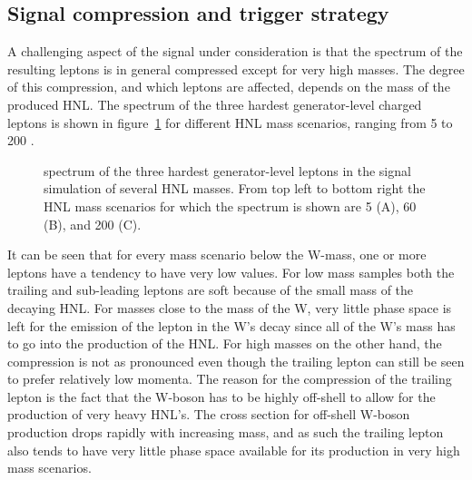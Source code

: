 \subsection{Signal compression and trigger strategy}\label{sec:compression}
A challenging aspect of the signal under consideration is that the \pt spectrum of the resulting leptons is in general compressed except for very high masses. The degree of this compression, and which leptons are affected, depends on the mass of the produced HNL. The \pt spectrum of the three hardest generator-level charged leptons is shown in figure~\ref{fig:genPt} for different HNL mass scenarios, ranging from 5 to 200 \GeV . 

\begin{figure}[h]
\caption{\pt spectrum of the three hardest generator-level leptons in
  the signal simulation of several HNL masses. From top left to bottom
  right the HNL mass scenarios for which the spectrum is shown are 5
  \GeV (A), 60 \GeV (B), and 200 \GeV (C).}
\label{fig:genPt}
\end{figure}

It can be seen that for every mass scenario below the W-mass, one or
more leptons have a tendency to have very low \pt values. For low mass
samples both the trailing and sub-leading leptons are soft because of
the small mass of the decaying HNL. For masses close to the mass of
the W, very little phase space is left for the emission of the lepton
in the W's decay since all of the W's mass has to go into the
production of the HNL. For high masses on the other hand, the
compression is not as pronounced even though the trailing lepton can
still be seen to prefer relatively low momenta. The reason for the
compression of the trailing lepton is the fact that the W-boson has to
be highly off-shell to allow for the production of very heavy
HNL's. The cross section for off-shell W-boson production drops
rapidly with increasing mass, and as such the trailing lepton also
tends to have very little phase space available for its production in
very high mass scenarios.

